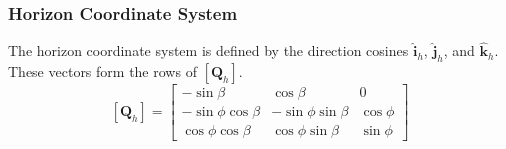 \subsubsection{Horizon Coordinate System}
The horizon coordinate system is defined by the direction cosines $\hat{\mathbf{i}}_h$, $\hat{\mathbf{j}}_h$,
and $\hat{\mathbf{k}}_h$. These vectors form the rows of $\left[\mathbf{Q}_h\right]$.
\begin{equation}
    \label{topocentric_horizon_Q}
    \left[\mathbf{Q}_h\right]=
        \begin{bmatrix}
            -\sin{\beta}           &  \cos{\beta}           & 0          \\
            -\sin{\phi}\cos{\beta} & -\sin{\phi}\sin{\beta} & \cos{\phi} \\
             \cos{\phi}\cos{\beta} &  \cos{\phi}\sin{\beta} & \sin{\phi}
        \end{bmatrix}
\end{equation}

